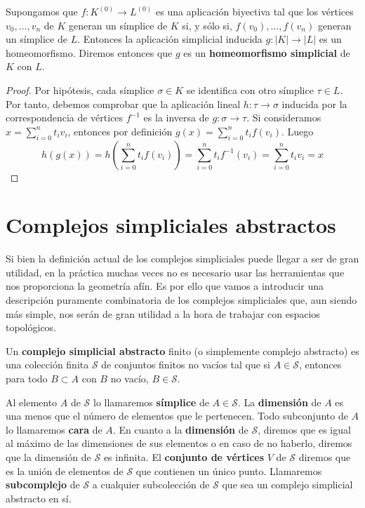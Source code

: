 \begin{lema}
	\label{lem:homeo_complex} Supongamos que \(f:K^{(0)}\rightarrow L^{(0)}\) es una
	aplicación biyectiva tal que los vértices \(v_{0}, \ldots, v_{n}\) de \(K\) generan
	un símplice de \(K\) si, y sólo si, \(f(v_{0}), \ldots, f(v_{n})\) generan un símplice
	de \(L\). Entonces la aplicación simplicial inducida \(g:|K| \rightarrow |L|\) es
	un homeomorfismo. Diremos entonces que \(g\) es un \textbf{homeomorfismo
	simplicial} de \(K\) con \(L\).
\end{lema}
\begin{proof}
	Por hipótesis, cada símplice \(\sigma \in K\) se identifica con otro símplice
	\(\tau \in L\). Por tanto, debemos comprobar que la aplicación lineal
	\(h: \tau \rightarrow \sigma\) inducida por la correspondencia de vértices
	\(f^{-1}\) es la inversa de \(g: \sigma \rightarrow \tau\). Si consideramos \(x = \sum
	_{i=0}^{n}t_{i}v_{i}\), entonces por definición
	\(g(x) = \sum_{i=0}^{n}t_{i}f(v_{i})\). Luego
	\[
		h(g(x)) = h(\sum_{i=0}^{n}t_{i}f(v_{i})) = \sum_{i=0}^{n}t_{i}f^{-1}(v_{i}) =
		\sum_{i=0}^{n}t_{i}v_{i}= x
	\]
\end{proof}

\section{Complejos simpliciales abstractos}

Si bien la definición actual de los complejos simpliciales puede llegar a ser de
gran utilidad, en la práctica muchas veces no es necesario usar las herramientas
que nos proporciona la geometría afín. Es por ello que vamos a introducir una
descripción puramente combinatoria de los complejos simpliciales que, aun siendo
más simple, nos serán de gran utilidad a la hora de trabajar con espacios
topológicos.

\begin{definicion}
	Un \textbf{complejo simplicial abstracto} finito (o simplemente complejo abstracto)
	es una colección finita \(\mathcal{S}\) de conjuntos finitos no vacíos tal que
	si \(A \in \mathcal{S}\), entonces para todo \(B \subset A\) con \(B\) no vacío,
	\(B \in \mathcal{S}\).
\end{definicion}

Al elemento \(A\) de \(\mathcal{S}\) lo llamaremos \textbf{símplice} de
\(A \in \mathcal{S}\). La \textbf{dimensión} de \(A\) es una menos que el número de
elementos que le pertenecen. Todo subconjunto de \(A\) lo llamaremos \textbf{cara}
de \(A\). En cuanto a la \textbf{dimensión} de \(\mathcal{S}\), diremos que es igual
al máximo de las dimensiones de sus elementos o en caso de no haberlo, diremos
que la dimensión de \(\mathcal{S}\) es infinita. El \textbf{conjunto de vértices}
\(V\) de \(\mathcal{S}\) diremos que es la unión de elementos de \(\mathcal{S}\) que
contienen un único punto. Llamaremos \textbf{subcomplejo} de \(\mathcal{S}\) a
cualquier subcolección de \(\mathcal{S}\) que sea un complejo simplicial abstracto
en sí.

